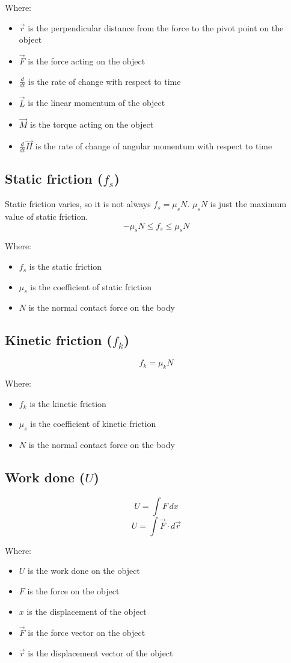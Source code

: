 \documentclass[11pt]{article}
\begin{document}
Where:
\begin{itemize}
\item \(\vec{r}\) is the perpendicular distance from the force to the pivot point on the object
\item \(\vec{F}\) is the force acting on the object
\item \(\frac{d}{dt}\) is the rate of change with respect to time
\item \(\vec{L}\) is the linear momentum of the object
\item \(\vec{M}\) is the torque acting on the object
\item \(\frac{d}{dt} \vec{H}\) is the rate of change of angular momentum with respect to time
\end{itemize}

 \newpage
\subsection{Static friction (\(f_s\))}
\label{sec:org8ad79ac}
Static friction varies, so it is not always \(f_s = \mu_s N\).
\(\mu_s N\) is just the maximum value of static friction.
\[-\mu_s N \le f_s \le \mu_s N\]

Where:
\begin{itemize}
\item \(f_s\) is the static friction
\item \(\mu_s\) is the coefficient of static friction
\item \(N\) is the normal contact force on the body
\end{itemize}
\subsection{Kinetic friction (\(f_k\))}
\label{sec:org49d1430}
\[f_k = \mu_k N\]

Where:
\begin{itemize}
\item \(f_k\) is the kinetic friction
\item \(\mu_s\) is the coefficient of kinetic friction
\item \(N\) is the normal contact force on the body
\end{itemize}
\subsection{Work done (\(U\))}
\label{sec:org42ebdd9}
\[U = \int F \, dx\]
\[U = \int \vec{F} \cdot d \vec{r}\]

Where:
\begin{itemize}
\item \(U\) is the work done on the object
\item \(F\) is the force on the object
\item \(x\) is the displacement of the object
\item \(\vec{F}\) is the force vector on the object
\item \(\vec{r}\) is the displacement vector of the object
\end{itemize}
\end{document}
